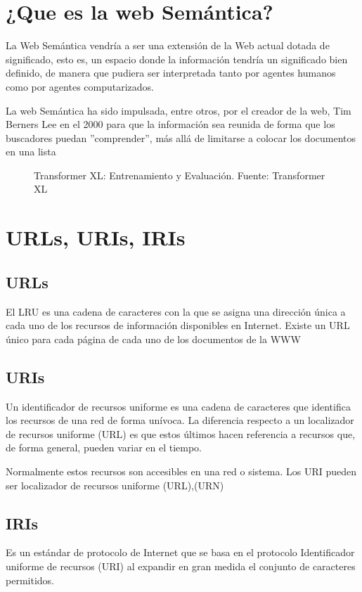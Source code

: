 \documentclass[conference]{IEEEtran}
\begin{document}
\vspace{0.2cm}

\section{¿Que es la web Semántica?}

La Web Semántica vendría a ser una extensión de la Web actual dotada de significado, esto es, un espacio donde la información tendría un significado bien definido, de manera que pudiera ser interpretada tanto por agentes humanos como por agentes computarizados.

\vspace{0.2cm}

La web Semántica ha sido impulsada, entre otros, por el creador de la web, Tim Berners Lee en el 2000 para que la información sea reunida de forma que los buscadores puedan ''comprender'', más allá de limitarse a colocar los documentos en una lista

\begin{figure}[h]
	\caption{Transformer XL: Entrenamiento y Evaluación. Fuente: Transformer XL \cite{b7}}
\end{figure}

\section{URLs, URIs, IRIs}
\subsection{URLs}
El LRU es una cadena de caracteres con la que se asigna una dirección única a cada uno de los recursos de información disponibles en Internet. Existe un URL único para cada página de cada uno de los documentos de la WWW

\subsection{URIs}
Un identificador de recursos uniforme es una cadena de caracteres que identifica los recursos de una red de forma unívoca. La diferencia respecto a un localizador de recursos uniforme (URL) es que estos últimos hacen referencia a recursos que, de forma general, pueden variar en el tiempo. 

Normalmente estos recursos son accesibles en una red o sistema. Los URI pueden ser localizador de recursos uniforme (URL),(URN)
\subsection{IRIs}
Es un estándar de protocolo de Internet que se basa en el protocolo Identificador uniforme de recursos (URI) al expandir en gran medida el conjunto de caracteres permitidos.
\end{document}
